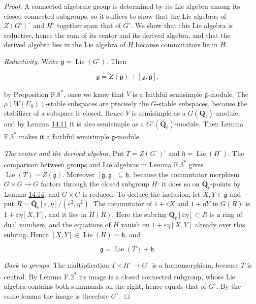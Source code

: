 \documentclass[11pt]{article}
\newcommand{\bpout}[1]{#1\textsuperscript{\hyperlink{bp-outside}{\ensuremath{\ast}}}}
\begin{document}
\begin{proof}[{Proof}]\label{bp50}%
A connected algebraic group is determined by its Lie algebra among its closed connected subgroups, so it suffices to show that the Lie algebras of \(Z(G^\circ)^\circ\) and \(H^\circ\) together span that of \(G^\circ\). We show that this Lie algebra is reductive, hence the sum of its center and its derived algebra, and that the derived algebra lies in the Lie algebra of \(H\) because commutators lie in \(H\).

\emph{Reductivity.} Write \(\mathfrak g=\operatorname{Lie}(G^\circ)\). Then

\[
\mathfrak g=Z(\mathfrak g)+[\mathfrak g,\mathfrak g],
\]

by Proposition \bpout{F.8}, once we know that \(V\) is a faithful semisimple \(\mathfrak g\)-module. The \(\rho(W(U_0))\)-stable subspaces are precisely the \(G\)-stable subspaces, because the stabilizer of a subspace is closed. Hence \(V\) is semisimple as a \(G(\overline{\mathbf Q}_\ell)\)-module, and by Lemma \hyperref[bp37]{14.11} it is also semisimple as a \(G^\circ(\overline{\mathbf Q}_\ell)\)-module. Then Lemma \bpout{F.3} makes it a faithful semisimple \(\mathfrak g\)-module.

\emph{The center and the derived algebra.} Put \(T=Z(G^\circ)^\circ\) and \(\mathfrak h=\operatorname{Lie}(H^\circ)\). The comparison between groups and Lie algebras in Lemma \bpout{F.3} gives \(\operatorname{Lie}(T)=Z(\mathfrak g)\). Moreover \([\mathfrak g,\mathfrak g]\subseteq\mathfrak h\), because the commutator morphism \(G\times G\to G\) factors through the closed subgroup \(H\): it does so on \(\overline{\mathbf Q}_\ell\)-points by Lemma \hyperref[bp46]{14.14}, and \(G\times G\) is reduced. To deduce the inclusion, let \(X,Y\in\mathfrak g\) and put \(R=\overline{\mathbf Q}_\ell[\varepsilon,\eta]/(\varepsilon^2,\eta^2)\). The commutator of \(1+\varepsilon X\) and \(1+\eta Y\) in \(G(R)\) is \(1+\varepsilon\eta[X,Y]\), and it lies in \(H(R)\). Here the subring \(\overline{\mathbf Q}_\ell[\varepsilon\eta]\subset R\) is a ring of dual numbers, and the equations of \(H\) vanish on \(1+\varepsilon\eta[X,Y]\) already over this subring. Hence \([X,Y]\in\operatorname{Lie}(H)=\mathfrak h\), and

\[
\mathfrak g=\operatorname{Lie}(T)+\mathfrak h.
\]

\emph{Back to groups.} The multiplication \(T\times H^\circ\to G^\circ\) is a homomorphism, because \(T\) is central. By Lemma \bpout{F.2} its image is a closed connected subgroup, whose Lie algebra contains both summands on the right, hence equals that of \(G^\circ\). By the same lemma the image is therefore \(G^\circ\).
\end{proof}
\end{document}
